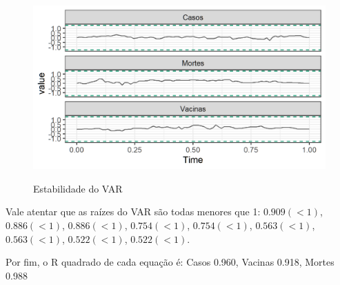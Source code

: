 \documentclass[
	12pt,				%
	oneside,			%
	a4paper,			%
	english,			%
	brazil				%
	hyperref = {colorlinks, citecolor=c1d, linkcolor=c2d, urlcolor=c3d, colorlinks}
	]{abntex2}
\begin{document}
\begin{apendicesenv}
\begin{figure}[H]
    \centering
    \caption{Estabilidade do VAR}
    \includegraphics[]{Figuras/varstab.png}
    \label{fig:varstab}
\end{figure}

Vale atentar que as raízes do VAR são todas menores que 1: $0.909 (<1)$,	$0.886 (<1)$,	$0.886 (<1)$,	$0.754 (<1)$,	$0.754 (<1)$,	$0.563 (<1)$,	$0.563 (<1)$,	$0.522 (<1)$,	$0.522 (<1)$.

Por fim, o R quadrado de cada equação é: Casos 0.960, Vacinas 0.918, Mortes 0.988

\newpage

\end{apendicesenv}
\end{document}

